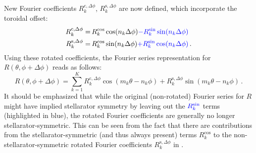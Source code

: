 New Fourier coefficients $R_k^{\mathrm{c},\Delta \phi}$, $R_k^{\mathrm{s},\Delta \phi}$ are now defined, which incorporate the toroidal offset:
\begin{align}
  R_k^{\mathrm{c},\Delta \phi} =&\, R_k^\mathrm{cos} \cos(n_k \Delta \phi) {\color{blue} - R_k^\mathrm{sin} \sin(n_k \Delta \phi) } \label{eqn:rkcosrot} \\
  R_k^{\mathrm{s},\Delta \phi} =&\, R_k^\mathrm{cos} \sin(n_k \Delta \phi) {\color{blue} + R_k^\mathrm{sin} \cos(n_k \Delta \phi) } \label{eqn:rksinrot} \, .
\end{align}
Using these rotated coefficients, the Fourier series representation for $R(\theta, \phi + \Delta \phi)$ reads as follows:
\begin{equation}
  R(\theta, \phi + \Delta \phi) = \sum_{k=1}^{K}   R_k^{\mathrm{c},\Delta \phi} \cos(m_k \theta - n_k \phi)
                                                 + R_k^{\mathrm{s},\Delta \phi} \sin(m_k \theta - n_k \phi) \, .
\end{equation}
It should be emphasized that while the original (non-rotated) Fourier series for $R$
might have implied stellarator symmetry by leaving out the ${\color{blue} R_k^\mathrm{sin} }$ terms (highlighted in blue),
the rotated Fourier coefficients are generally no longer stellarator-symmetric.
This can be seen from the fact that there are contributions from the stellarator-symmetric (and thus always present) terms $R_k^\mathrm{cos}$
to the non-stellarator-symmetric rotated Fourier coefficients $R_k^{\mathrm{s},\Delta \phi}$ in .

\FloatBarrier
\newpage
